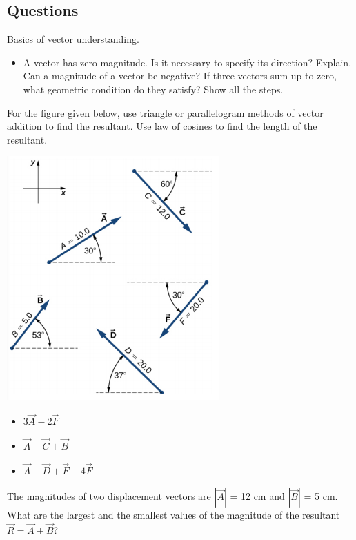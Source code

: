 \documentclass[12pt,addpoints]{exam}
\begin{document}
\begin{questions}
\begin{center}
			\subsection*{Questions}	
		\end{center}
		\question Basics of vector understanding.
		\begin{itemize}
			\item A vector has zero magnitude. Is it necessary to specify its direction? Explain. \vspace{1cm}
			\question Can a magnitude of a vector be negative?\vspace{1cm}
			\question If three vectors sum up to zero, what geometric condition do they satisfy? Show all the steps. \vspace{1.5in}
		\end{itemize}
		\question For the figure given below, use triangle or parallelogram methods of vector addition to find the resultant. Use law of cosines to find the length of the resultant.
		\begin{center}
			\includegraphics[scale=0.6]{vectors}
		\end{center}
		\begin{itemize}
			\item $3\vec{A} - 2 \vec{F}$ \vspace{1.5in}
			\item $\vec{A} -  \vec{C} + \vec{B}$ \vspace{1.5in}
			\item $\vec{A} -  \vec{D} + \vec{F}-4\vec{F}$ \vspace{1.5in}
		\end{itemize}
		\question The magnitudes of two displacement vectors are $|\vec{A}|$ = 12 cm and $|\vec{B}|$ = 5 cm. What are the largest and the smallest values of the magnitude of the resultant  $\vec{R}=\vec{A}+\vec{B}$? \vspace{2cm}

\end{questions}
\end{document}
